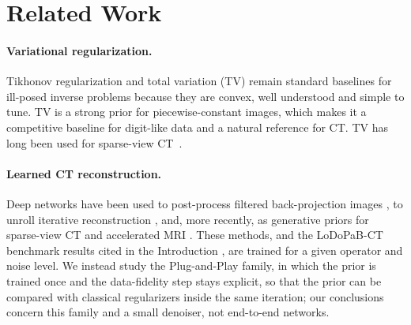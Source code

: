 \section{Related Work}
\label{sec:related}

\paragraph{Variational regularization.} Tikhonov regularization and total variation (TV) \citep{rudin1992tv}
remain standard baselines for ill-posed inverse problems because they are convex, well understood and
simple to tune. TV is a strong prior for piecewise-constant images, which makes it a competitive baseline
for digit-like data and a natural reference for CT. TV has long been used for sparse-view CT~\citep{sidky2008tv}.

\paragraph{Learned CT reconstruction.} Deep networks have been used to post-process filtered
back-projection images \citep{jin2017}, to unroll iterative reconstruction \citep{adler2018}, and, more
recently, as generative priors for sparse-view CT and accelerated MRI \citep{song2022}. These methods, and
the LoDoPaB-CT benchmark results cited in the Introduction \citep{leuschner2021}, are trained for a given
operator and noise level. We instead study the Plug-and-Play family, in which the prior is trained once and
the data-fidelity step stays explicit, so that the prior can be compared with classical regularizers inside
the same iteration; our conclusions concern this family and a small denoiser, not end-to-end networks.

